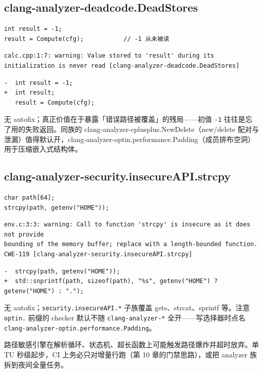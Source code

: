 \documentclass[12pt,a4paper,fontset=fandol]{ctexbook}
\newcommand{\Bk}{\discretionary{}{}{}}
\begin{document}
\subsection{clang-analyzer-deadcode.DeadStores}\label{sec:ch13-s6b}
\begin{lstlisting}[style=cppstyle]
int result = -1;
result = Compute(cfg);           // -1 从未被读
\end{lstlisting}
\begin{lstlisting}[style=shellstyle]
calc.cpp:1:7: warning: Value stored to 'result' during its initialization is never read [clang-analyzer-deadcode.DeadStores]
\end{lstlisting}
\begin{lstlisting}[style=diffstyle]
-  int result = -1;
+  int result;
   result = Compute(cfg);
\end{lstlisting}
无 autofix；真正价值在于暴露「错误路径被覆盖」的残局——初值 \texttt{-1} 往往是忘了用的失败返回。同族的 clang-analyzer-cplusplus.NewDelete（new/delete 配对与泄漏）值得默认开，clang-analyzer-optin.performance.Padding（成员排布空洞）用于压缩嵌入式结构体。
\subsection{clang-analyzer-security.insecureAPI.strcpy}\label{sec:ch13-s6c}
\begin{lstlisting}[style=cppstyle]
char path[64];
strcpy(path, getenv("HOME"));
\end{lstlisting}
\begin{lstlisting}[style=shellstyle]
env.c:3:3: warning: Call to function 'strcpy' is insecure as it does not provide
bounding of the memory buffer; replace with a length-bounded function. CWE-119 [clang-analyzer-security.insecureAPI.strcpy]
\end{lstlisting}
\begin{lstlisting}[style=diffstyle]
-  strcpy(path, getenv("HOME"));
+  std::snprintf(path, sizeof(path), "%s", getenv("HOME") ? getenv("HOME") : ".");
\end{lstlisting}
无 autofix；\texttt{security.insecureAPI.*} 子族覆盖 gets、strcat、sprintf 等。注意 \texttt{optin.} 前缀的 checker 默认不随 \texttt{clang-{\Bk}analyzer-*} 全开——写选择器时点名 \texttt{clang-{\Bk}analyzer-{\Bk}optin.performance.Padding}。
\begin{note}[title={analyzer 的成本税}]
路径敏感引擎在解析循环、状态机、超长函数上可能触发路径爆炸并超时放弃。单 TU 秒级起步，CI 上务必只对增量行跑（第 10 章的门禁思路），或把 analyzer 族拆到夜间全量任务。
\end{note}
\end{document}
